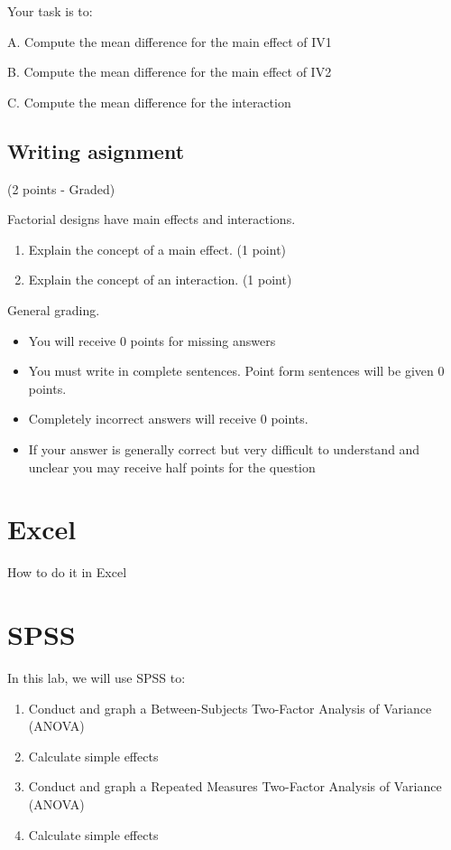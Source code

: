 \documentclass[
]{book}
\providecommand{\tightlist}{%
  \setlength{\itemsep}{0pt}\setlength{\parskip}{0pt}}
\begin{document}
Your task is to:

A. Compute the mean difference for the main effect of IV1

B. Compute the mean difference for the main effect of IV2

C. Compute the mean difference for the interaction

\hypertarget{writing-asignment}{%
\subsection{Writing asignment}\label{writing-asignment}}

(2 points - Graded)

Factorial designs have main effects and interactions.

\begin{enumerate}
\def\labelenumi{\arabic{enumi}.}
\item
  Explain the concept of a main effect. (1 point)
\item
  Explain the concept of an interaction. (1 point)
\end{enumerate}

General grading.

\begin{itemize}
\tightlist
\item
  You will receive 0 points for missing answers
\item
  You must write in complete sentences. Point form sentences will be given 0 points.
\item
  Completely incorrect answers will receive 0 points.
\item
  If your answer is generally correct but very difficult to understand and unclear you may receive half points for the question
\end{itemize}

\hypertarget{excel-9}{%
\section{Excel}\label{excel-9}}

How to do it in Excel

\hypertarget{spss-9}{%
\section{SPSS}\label{spss-9}}

In this lab, we will use SPSS to:

\begin{enumerate}
\def\labelenumi{\arabic{enumi}.}
\tightlist
\item
  Conduct and graph a Between-Subjects Two-Factor Analysis of Variance (ANOVA)
\item
  Calculate simple effects
\item
  Conduct and graph a Repeated Measures Two-Factor Analysis of Variance (ANOVA)
\item
  Calculate simple effects
\end{enumerate}
\end{document}
